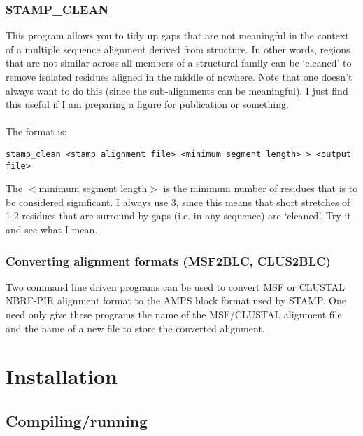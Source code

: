 \subsection{STAMP\_CLEAN}

This program allows you to tidy up gaps that are not meaningful in the context
of a multiple sequence alignment derived from structure.  In other words, regions
that are not similar across all members of a structural family can be `cleaned' to
remove isolated residues aligned in the middle of nowhere.  Note that one doesn't always 
want  to do this (since the sub-alignments can be meaningful).  I just find this
useful if I am preparing a figure for publication or something.\\
\\
The format is:

\begin{scriptsize}\begin{verbatim}
stamp_clean <stamp alignment file> <minimum segment length> > <output file>
\end{verbatim} \end{scriptsize}

The $<$minimum segment length$>$ is the minimum number of residues that is to
be considered significant.  I always use 3, since this means that short stretches of
1-2 residues that are surround by gaps (i.e. in any sequence) are `cleaned'.  Try it 
and see what I mean.

\subsection{Converting alignment formats (MSF2BLC, CLUS2BLC)}

Two command line driven programs can be used to convert MSF or CLUSTAL NBRF-PIR
alignment format to the AMPS block format used by STAMP.  One need only give
these programs the name of the MSF/CLUSTAL alignment file and the name of a new
file to store the converted alignment.

\chapter{Installation}

\section{Compiling/running}


